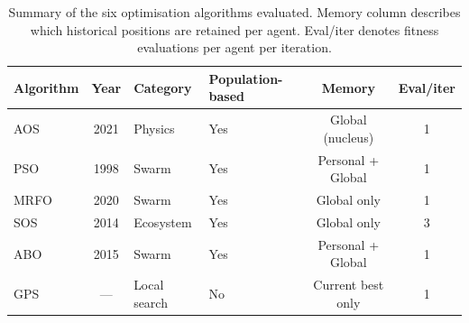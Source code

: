 \begin{table}[H]
  \caption{\label{tab:alg_summary}%
    Summary of the six optimisation algorithms evaluated. Memory column
    describes which historical positions are retained per agent. Eval/iter
  denotes fitness evaluations per agent per iteration.}
  \begin{ruledtabular}
    \begin{tabular}{lcllcc}
      Algorithm & Year & Category     & Population-based & Memory
      & Eval/iter \\
      \hline
      AOS       & 2021 & Physics      & Yes              & Global (nucleus)     & 1 \\
      PSO       & 1998 & Swarm        & Yes              & Personal + Global    & 1 \\
      MRFO      & 2020 & Swarm        & Yes              & Global only          & 1 \\
      SOS       & 2014 & Ecosystem    & Yes              & Global only          & 3 \\
      ABO       & 2015 & Swarm        & Yes              & Personal + Global    & 1 \\
      GPS       & ---  & Local search & No               & Current best only    & 1 \\
    \end{tabular}
  \end{ruledtabular}
\end{table}
